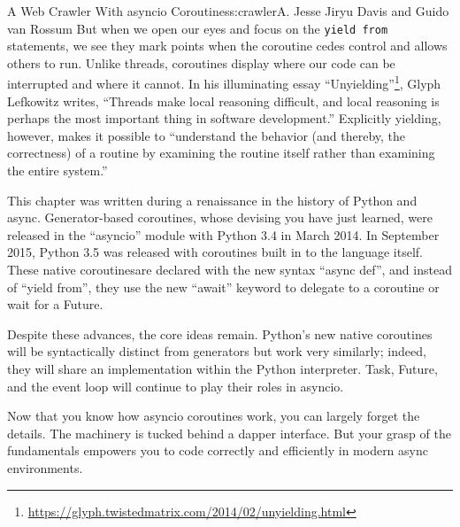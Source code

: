 \begin{aosachapter}{A Web Crawler With asyncio Coroutines}{s:crawler}{A. Jesse Jiryu Davis and Guido van Rossum}
But when we open our eyes and focus on the \texttt{yield from}
statements, we see they mark points when the coroutine cedes control and
allows others to run. Unlike threads, coroutines display where our code
can be interrupted and where it cannot. In his illuminating essay
``Unyielding''\footnote{\url{https://glyph.twistedmatrix.com/2014/02/unyielding.html}},
Glyph Lefkowitz writes, ``Threads make local reasoning difficult, and
local reasoning is perhaps the most important thing in software
development.'' Explicitly yielding, however, makes it possible to
``understand the behavior (and thereby, the correctness) of a routine by
examining the routine itself rather than examining the entire system.''

This chapter was written during a renaissance in the history of Python
and async. Generator-based coroutines, whose devising you have just
learned, were released in the ``asyncio'' module with Python 3.4 in
March 2014. In September 2015, Python 3.5 was released with coroutines
built in to the language itself. These native coroutinesare declared
with the new syntax ``async def'', and instead of ``yield from'', they
use the new ``await'' keyword to delegate to a coroutine or wait for a
Future.

Despite these advances, the core ideas remain. Python's new native
coroutines will be syntactically distinct from generators but work very
similarly; indeed, they will share an implementation within the Python
interpreter. Task, Future, and the event loop will continue to play
their roles in asyncio.

Now that you know how asyncio coroutines work, you can largely forget
the details. The machinery is tucked behind a dapper interface. But your
grasp of the fundamentals empowers you to code correctly and efficiently
in modern async environments.

\end{aosachapter}
